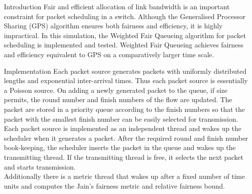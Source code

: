 \begin{section}{Introduction}
Fair and efficient allocation of link bandwidth is an important constraint for packet scheduling in a switch. Although the Generalised Processor Sharing (GPS) algorithm ensures both fairness and efficiency, it is highly impractical. In this simulation, the Weighted Fair Queueing algorithm for packet scheduling is implemented and tested. Weighted Fair Queueing achieves fairness and efficiency equivalent to GPS on a comparatively larger time scale. 
\end{section}


\begin{section}{Implementation}
Each packet source generates packets with uniformly distributed lengths and exponential inter-arrival times. Thus each packet source is essentially a Poisson source. On adding a newly generated packet to the queue, if size permits, the round number and finish numbers of the flow are updated. The packet are stored in a priority queue according to the finish numbers so that the packet with the smallest finish number can be easily selected for transmission. \\
Each packet source is implemented as an independent thread and wakes up the scheduler when it generates a packet. After the required round and finish number book-keeping, the scheduler inserts the packet in the queue and wakes up the transmitting thread. If the transmitting thread is free, it selects the next packet and starts transmission. \\
Additionally there is a metric thread that wakes up after a fixed number of time units and computes the Jain's fairness metric and relative fairness bound.
\end{section}

